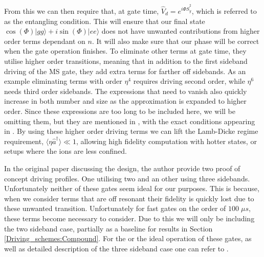 \documentclass[12pt,twoside]{report}
\begin{document}
From this we can then require that, at gate time, $\hat{V}_d=e^{i\Phi\hat{S}_y^2}$, which is referred to as the entangling condition. This will ensure that our final state ${\cos\left(\Phi\right)|gg\rangle + i\sin\left(\Phi\right)|ee\rangle}$ does not have unwanted contributions from higher order terms dependant on $n$. It will also make sure that our phase will be correct when the gate operation finishes. To eliminate other terms at gate time, they utilise higher order transitions, meaning that in addition to the first sideband driving of the MS gate, they add extra terms for farther off sidebands. As an example eliminating terms with order $\eta^4$ requires driving second order, while $\eta^6$ needs third order sidebands. The expressions that need to vanish also quickly increase in both number and size as the approximation is expanded to higher order. Since these expressions are too long to be included here, we will be omitting them, but they are mentioned in \cite{SC_Paper}, with the exact conditions appearing in \cite{SC_github}. By using these higher order driving terms we can lift the Lamb-Dicke regime requirement, $\langle\eta\hat{a}^{\dagger}\rangle\ll 1$, allowing high fidelity computation with hotter states, or setups where the ions are less confined.

In the original paper discussing the design, the author provide two proof of concept driving profiles. One utilising two and an other using three sidebands. Unfortunately neither of these gates seem ideal for our purposes. This is because, when we consider terms that are off resonant their fidelity is quickly lost due to these unwanted transition. Unfortunately for fast gates on the order of $100\;\mu s$, these terms become necessary to consider. Due to this we will only be including the two sideband case, partially as a baseline for results in Section \ref{Driving_schemes:Compound}. For the or the ideal operation of these gates, as well as detailed description of the three sideband case one can refer to \cite{SC_Paper}.
\end{document}
